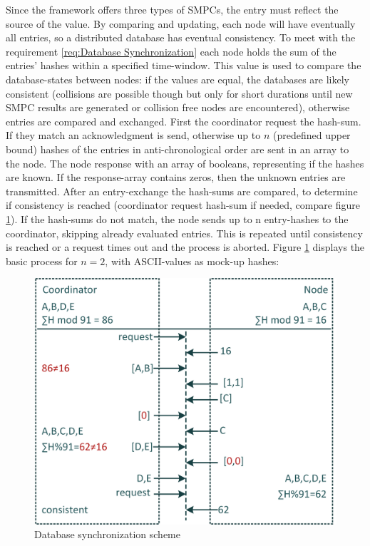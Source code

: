 Since the framework offers three types of \glspl{SMPC}, the entry must reflect the source of the value. By comparing and updating, each node will have eventually all entries, so a distributed database has eventual consistency.
To meet with the requirement \ref{req:Database Synchronization} each node holds the sum of the entries' hashes within a specified time-window. This value is used to compare the database-states between nodes: if the values are equal, the databases are likely consistent (collisions are possible though but only for short durations until new \gls{SMPC} results are generated or collision free nodes are encountered), otherwise entries are compared and exchanged. First the coordinator request the hash-sum. If they match an acknowledgment is send, otherwise up to $n$ (predefined upper bound) hashes of the entries in anti-chronological order are sent in an array to the node. The node response with an array of booleans, representing if the hashes are known. If the response-array contains zeros, then the unknown entries are transmitted. After an entry-exchange the hash-sums are compared, to determine if consistency is reached (coordinator request hash-sum if needed, compare figure \ref{figure:Database synchronization scheme}). If the hash-sums do not match, the node sends up to n entry-hashes to the coordinator, skipping already evaluated entries. This is repeated until consistency is reached or a request times out and the process is aborted.
Figure \ref{figure:Database synchronization scheme} displays the basic process for $n=2$, with ASCII-values as mock-up hashes:

\begin{figure}[!htbp] %
	\caption{Database synchronization scheme} \label{figure:Database synchronization scheme}
	\includegraphics[scale=1.0]{figures/db-synchronization-ion.png}
\end{figure}

